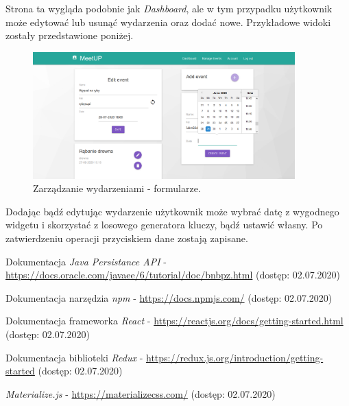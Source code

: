 \documentclass[12pt]{article}
\begin{document}
Strona ta wygląda podobnie jak \textit{Dashboard}, ale w tym przypadku użytkownik może edytować lub usunąć wydarzenia oraz dodać nowe. Przykładowe widoki zostały przedstawione poniżej.

\begin{figure}[H]
\centering
\includegraphics[width=0.9\textwidth]{meetup_manage_form.png}
\caption{Zarządzanie wydarzeniami - formularze.}
\end{figure}

Dodając bądź edytując wydarzenie użytkownik może wybrać datę z wygodnego widgetu i skorzystać z losowego generatora kluczy, bądź ustawić własny. Po zatwierdzeniu operacji przyciskiem dane zostają zapisane.

\begin{thebibliography}{9}

Dokumentacja \textit{Java Persistance API} - \url{https://docs.oracle.com/javaee/6/tutorial/doc/bnbpz.html} (dostęp: 02.07.2020)

Dokumentacja narzędzia \textit{npm} - \url{https://docs.npmjs.com/} (dostęp: 02.07.2020)

Dokumentacja frameworka \textit{React} - \url{https://reactjs.org/docs/getting-started.html} (dostęp: 02.07.2020)

Dokumentacja biblioteki \textit{Redux} - \url{https://redux.js.org/introduction/getting-started} (dostęp: 02.07.2020)

\textit{Materialize.js} - \url{https://materializecss.com/} (dostęp: 02.07.2020)

\end{thebibliography}
\end{document}

